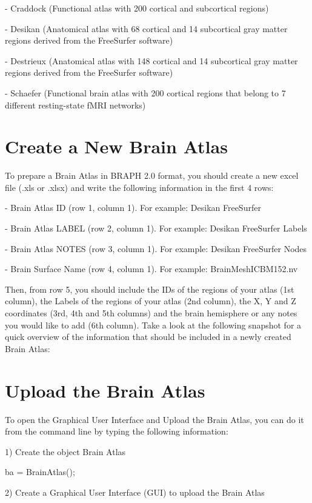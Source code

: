 \documentclass{tufte-handout}
\begin{document}
- Craddock (Functional atlas with 200 cortical and subcortical regions)


- Desikan (Anatomical atlas with 68 cortical and 14 subcortical gray matter regions derived from the FreeSurfer software)


-  Destrieux (Anatomical atlas with 148 cortical and 14 subcortical gray matter regions derived from the FreeSurfer software)


- Schaefer (Functional brain atlas with 200 cortical regions that belong to 7 different resting-state fMRI networks)




\section{Create a New Brain Atlas}

To prepare a Brain Atlas in BRAPH 2.0 format, you should create a new excel file (.xls or .xlsx) and write the following information in the first 4 rows:

- Brain Atlas ID (row 1, column 1).
For example: Desikan FreeSurfer


- Brain Atlas LABEL (row 2, column 1).
For example: Desikan FreeSurfer Labels


- Brain Atlas NOTES (row 3, column 1).
For example: Desikan FreeSurfer Nodes


- Brain Surface Name (row 4, column 1).
For example: BrainMeshICBM152.nv


Then, from row 5, you should include the IDs of the regions of your atlas (1st column), the Labels of the regions of your atlas (2nd column), the X, Y and Z coordinates (3rd, 4th and 5th columns) and the brain hemisphere or any notes you would like to add (6th column). Take a look at the following snapshot for a quick overview of the information that should be included in a newly created Brain Atlas:


\section{Upload the Brain Atlas}

To open the Graphical User Interface and Upload the Brain Atlas, you can do it from the command line by typing the following information:


1) Create the object Brain Atlas

ba = BrainAtlas();


2) Create a Graphical User Interface (GUI) to upload the Brain Atlas
\end{document}
